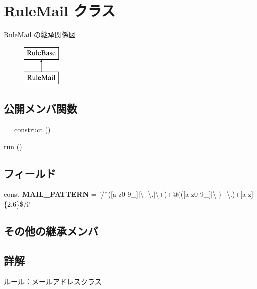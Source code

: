 \hypertarget{class_rule_mail}{\section{Rule\+Mail クラス}
\label{class_rule_mail}
}
Rule\+Mail の継承関係図\begin{figure}[H]
\begin{center}
\leavevmode
\includegraphics[height=2.000000cm]{class_rule_mail}
\end{center}
\end{figure}
\subsection*{公開メンバ関数}
\begin{DoxyCompactItemize}
\item 
\hyperlink{class_rule_mail_a095c5d389db211932136b53f25f39685}{\+\_\+\+\_\+construct} ()
\item 
\hyperlink{class_rule_mail_afb0fafe7e02a3ae1993c01c19fad2bae}{run} ()
\end{DoxyCompactItemize}
\subsection*{フィールド}
\begin{DoxyCompactItemize}
\item 
\hypertarget{class_rule_mail_ae120b9206d39e1922b268a74697c4775}{const {\bfseries M\+A\+I\+L\+\_\+\+P\+A\+T\+T\+E\+R\+N} = '/$^\wedge$(\mbox{[}a-\/z0-\/9\+\_\+\mbox{]}$\vert$\textbackslash{}-\/$\vert$\textbackslash{}.$\vert$\textbackslash{}+)+@((\mbox{[}a-\/z0-\/9\+\_\+\mbox{]}$\vert$\textbackslash{}-\/)+\textbackslash{}.)+\mbox{[}a-\/z\mbox{]}\{2,6\}\$/i'}\label{class_rule_mail_ae120b9206d39e1922b268a74697c4775}

\end{DoxyCompactItemize}
\subsection*{その他の継承メンバ}


\subsection{詳解}
ルール：メールアドレスクラス

